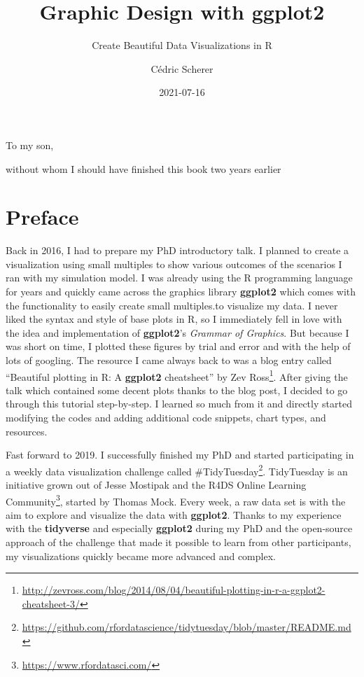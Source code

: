 \documentclass[
]{krantz}
\title{Graphic Design with ggplot2}
\subtitle{Create Beautiful Data Visualizations in R}
\author{Cédric Scherer}
\date{2021-07-16}
\renewcommand{\href}[2]{#2\footnote{\url{#1}}}
\begin{document}
\maketitle


\thispagestyle{empty}

\begin{center}
To my son,

without whom I should have finished this book two years earlier
\end{center}

\setlength{\abovedisplayskip}{-5pt}
\setlength{\abovedisplayshortskip}{-5pt}

{
\hypersetup{linkcolor=}
\setcounter{tocdepth}{2}
\tableofcontents
}
\listoftables
\listoffigures
\hypertarget{preface}{%
\chapter*{Preface}\label{preface}}


Back in 2016, I had to prepare my PhD introductory talk. I planned to create a visualization using small multiples to show various outcomes of the scenarios I ran with my simulation model. I was already using the R programming language for years and quickly came across the graphics library \textbf{ggplot2} which comes with the functionality to easily create small multiples.to visualize my data. I never liked the syntax and style of base plots in R, so I immediately fell in love with the idea and implementation of \textbf{ggplot2}'s \emph{Grammar of Graphics}. But because I was short on time, I plotted these figures by trial and error and with the help of lots of googling. The resource I came always back to was a blog entry called \href{http://zevross.com/blog/2014/08/04/beautiful-plotting-in-r-a-ggplot2-cheatsheet-3/}{``Beautiful plotting in R: A \textbf{ggplot2} cheatsheet'' by Zev Ross}. After giving the talk which contained some decent plots thanks to the blog post, I decided to go through this tutorial step-by-step. I learned so much from it and directly started modifying the codes and adding additional code snippets, chart types, and resources.

Fast forward to 2019. I successfully finished my PhD and started participating in a weekly data visualization challenge called \href{https://github.com/rfordatascience/tidytuesday/blob/master/README.md}{\#TidyTuesday}. TidyTuesday is an initiative grown out of Jesse Mostipak and the \href{https://www.rfordatasci.com/}{R4DS Online Learning Community}, started by Thomas Mock. Every week, a raw data set is with the aim to explore and visualize the data with \textbf{ggplot2}. Thanks to my experience with the \textbf{tidyverse} and especially \textbf{ggplot2} during my PhD and the open-source approach of the challenge that made it possible to learn from other participants, my visualizations quickly became more advanced and complex.
\end{document}
